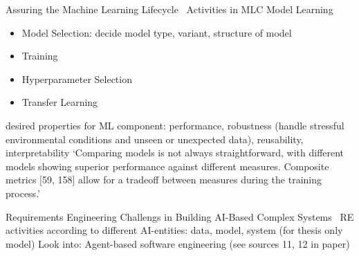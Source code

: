 Assuring the Machine Learning Lifecycle~\cite{ashmore_assuring_2021}
Activities in MLC Model Learning
\begin{itemize}
    \item Model Selection: decide model type, variant, structure of model
    \item Training
    \item Hyperparameter Selection
    \item Transfer Learning
\end{itemize}
desired properties for ML component: performance, robustness (handle stressful environmental
conditions and unseen or unexpected data), reusability, interpretability
`Comparing models is not always straightforward, with different models showing superior performance
against different measures. Composite metrics [59, 158] allow for a tradeoff between measures
during the training process.'

Requirements Engineering Challengs in Building AI-Based Complex Systems~\cite{belani_requirements_2019}
RE activities according to different AI-entities: data, model, system (for thesis only model)
Look into: Agent-based software engineering (see sources 11, 12 in paper)

